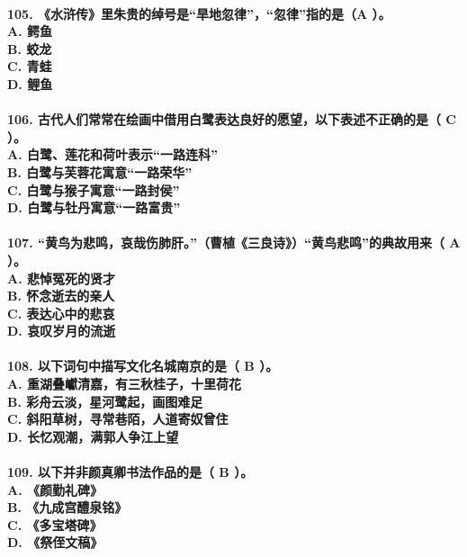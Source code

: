 \documentclass[UTF8]{ctexart} %
\begin{document}
\paragraph{
105. 《水浒传》里朱贵的绰号是“旱地忽律”，“忽律”指的是（\color{red}A\color{black}  ）。 \\
    A. 鳄鱼 \\
    B. 蛟龙 \\
    C. 青蛙 \\
    D. 鲤鱼
}
\paragraph{
106. 古代人们常常在绘画中借用白鹭表达良好的愿望，以下表述不正确的是（ \color{red}C\color{black} ）。 \\
    A. 白鹭、莲花和荷叶表示“一路连科” \\
    B. 白鹭与芙蓉花寓意“一路荣华” \\
    C. 白鹭与猴子寓意“一路封侯” \\
    D. 白鹭与牡丹寓意“一路富贵”
}
\paragraph{
107. “黄鸟为悲鸣，哀哉伤肺肝。”（曹植《三良诗》）“黄鸟悲鸣”的典故用来（ \color{red}A\color{black} ）。 \\
    A. 悲悼冤死的贤才 \\
    B. 怀念逝去的亲人 \\
    C. 表达心中的悲哀 \\
    D. 哀叹岁月的流逝
}
\paragraph{
108. 以下词句中描写文化名城南京的是（ \color{red}B\color{black} ）。 \\
    A. 重湖叠巘清嘉，有三秋桂子，十里荷花 \\
    B. 彩舟云淡，星河鹭起，画图难足 \\
    C. 斜阳草树，寻常巷陌，人道寄奴曾住 \\
    D. 长忆观潮，满郭人争江上望
}
\paragraph{
109. 以下并非颜真卿书法作品的是（ \color{red}B\color{black} ）。 \\
    A. 《颜勤礼碑》 \\
    B. 《九成宫醴泉铭》 \\
    C. 《多宝塔碑》 \\
    D. 《祭侄文稿》
}
\end{document}
